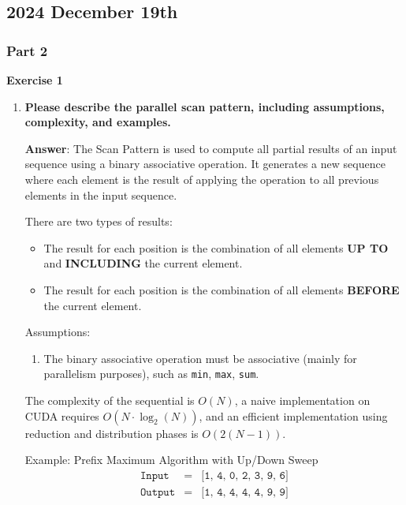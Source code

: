 \subsection{2024 December 19th}

\subsubsection{Part 2}

\begin{flushleft}
    \textcolor{Green3}{ \textbf{Exercise 1}}
\end{flushleft}
\begin{enumerate}[label=\Alph*.]
    \item \textcolor{Green3}{\textbf{%
        Please describe the parallel scan pattern, including assumptions, complexity, and examples.
    }}

    \textbf{Answer}: The Scan Pattern is used to compute all partial results of an input sequence using a binary associative operation. It generates a new sequence where each element is the result of applying the operation to all previous elements in the input sequence.

    There are two types of results:
    \begin{itemize}
        \item The result for each position is the combination of all elements \textbf{UP TO} and \textbf{INCLUDING} the current element.
        \item The result for each position is the combination of all elements \textbf{BEFORE} the current element.
    \end{itemize}
    
    Assumptions:
    \begin{enumerate}
        \item The binary associative operation must be associative (mainly for parallelism purposes), such as \texttt{min}, \texttt{max}, \texttt{sum}.
    \end{enumerate}
    The complexity of the sequential is $O(N)$, a naive implementation on CUDA requires $O\left(N \cdot \log_{2}(N)\right)$, and an efficient implementation using reduction and distribution phases is $O\left(2(N-1)\right)$.
    
    Example: Prefix Maximum Algorithm with Up/Down Sweep
    \begin{equation*}
        \begin{array}{rcl}
            \texttt{Input} &=& \texttt{[1, 4, 0, 2, 3, 9, 6]} \\
            \texttt{Output} &=& \texttt{[1, 4, 4, 4, 4, 9, 9]} \\
        \end{array}
    \end{equation*}


\end{enumerate}
